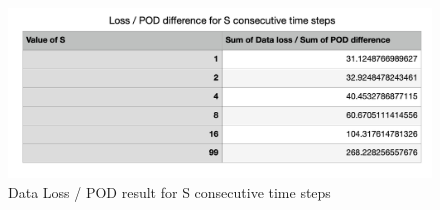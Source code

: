 \begin{figure}[H]
    \caption{Data Loss / POD result for S consecutive time steps}
    \includegraphics[scale=0.6]{Report LaTeX/figures/mantle_convection_images/further_testings/Data_loss_POD_division_table.png}
\end{figure}







